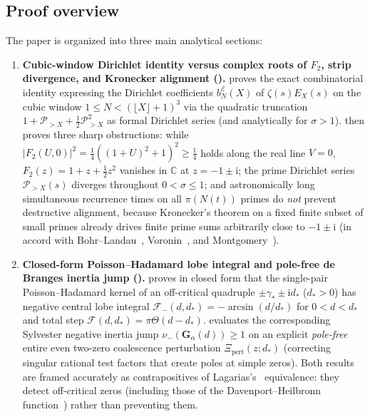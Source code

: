 \documentclass[11pt,reqno]{amsart}
\theoremstyle{plain}
\theoremstyle{definition}
\theoremstyle{remark}
\numberwithin{equation}{section}
\newcommand{\ii}{\mathrm{i}}
\begin{document}
\subsection{Proof overview}\label{subsec:overview}

The paper is organized into three main analytical sections:
\begin{enumerate}[label=\textup{(\arabic*)},leftmargin=2.2em]
\item \textbf{Cubic-window Dirichlet identity versus complex roots of $F_2$, strip divergence, and Kronecker alignment ().}  proves the exact combinatorial identity expressing the Dirichlet coefficients $b_N^{\mathcal{E}}(X)$ of $\zeta(s)E_X(s)$ on the cubic window $1 \le N < (\lfloor X\rfloor + 1)^3$ via the quadratic truncation $1 + \mathcal{P}_{>X} + \frac{1}{2}\mathcal{P}_{>X}^2$ as formal Dirichlet series (and analytically for $\sigma > 1$).  then proves three sharp obstructions: while $\lvert F_2(U,0)\rvert^2 = \frac{1}{4}((1+U)^2+1)^2 \ge \frac{1}{4}$ holds along the real line $V = 0$, $F_2(z) = 1 + z + \frac{1}{2}z^2$ vanishes in $\mathbb{C}$ at $z = -1 \pm \ii$; the prime Dirichlet series $\mathcal{P}_{>X}(s)$ diverges throughout $0 < \sigma \le 1$; and astronomically long simultaneous recurrence times on all $\pi(N(t))$ primes do \emph{not} prevent destructive alignment, because Kronecker's theorem on a fixed finite subset of small primes already drives finite prime sums arbitrarily close to $-1 \pm \ii$ (in accord with Bohr--Landau~\cite{bohrlandau1914}, Voronin~\cite{voronin1975}, and Montgomery~\cite{montgomery1977}).
\item \textbf{Closed-form Poisson--Hadamard lobe integral and pole-free de Branges inertia jump ().}  proves in closed form that the single-pair Poisson--Hadamard kernel of an off-critical quadruple $\pm\gamma_* \pm \ii d_*$ ($d_* > 0$) has negative central lobe integral $\mathcal{F}_-(d, d_*) = -\arcsin(d/d_*)$ for $0 < d < d_*$ and total step $\mathcal{F}(d, d_*) = \pi\Theta(d - d_*)$.  evaluates the corresponding Sylvester negative inertia jump $\nu_-(\mathbf{G}_\alpha(d)) \ge 1$ on an explicit \emph{pole-free} entire even two-zero coalescence perturbation $\Xi_{\mathrm{pert}}(z; d_*)$ (correcting singular rational test factors that create poles at simple zeros). Both results are framed accurately as contrapositives of Lagarias's~\cite{lagarias1999} equivalence: they detect off-critical zeros (including those of the Davenport--Heilbronn function~\cite{davenportheilbronn1936}) rather than preventing them.

\end{enumerate}
\end{document}
